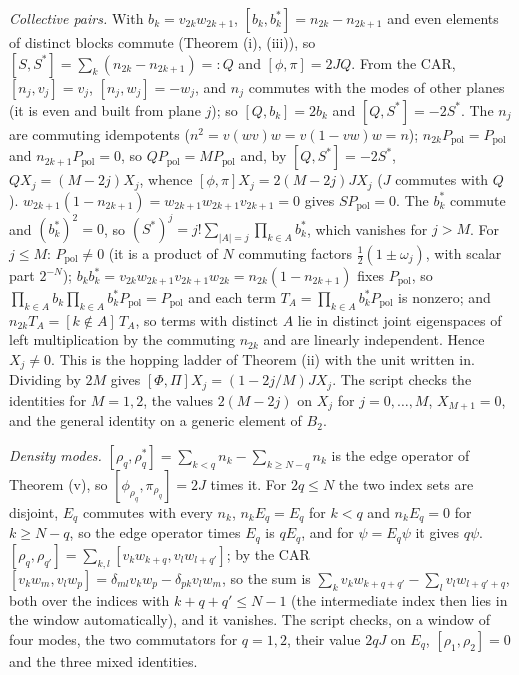\emph{Collective pairs.} With $b_{k} = v_{2k}w_{2k+1}$, $[b_{k}, b_{k}^{*}] = n_{2k} - n_{2k+1}$ and even elements of distinct blocks commute (Theorem (i), (iii)), so $[S, S^{*}] = \sum_{k}(n_{2k} - n_{2k+1}) =: Q$ and $[\phi, \pi] = 2JQ$. From the CAR, $[n_{j}, v_{j}] = v_{j}$, $[n_{j}, w_{j}] = -w_{j}$, and $n_{j}$ commutes with the modes of other planes (it is even and built from plane $j$); so $[Q, b_{k}] = 2b_{k}$ and $[Q, S^{*}] = -2S^{*}$. The $n_{j}$ are commuting idempotents ($n^{2} = v(wv)w = v(1 - vw)w = n$); $n_{2k}P_{\mathrm{pol}} = P_{\mathrm{pol}}$ and $n_{2k+1}P_{\mathrm{pol}} = 0$, so $QP_{\mathrm{pol}} = MP_{\mathrm{pol}}$ and, by $[Q, S^{*}] = -2S^{*}$, $QX_{j} = (M - 2j)X_{j}$, whence $[\phi, \pi]X_{j} = 2(M - 2j)JX_{j}$ ($J$ commutes with $Q$). $w_{2k+1}(1 - n_{2k+1}) = w_{2k+1}w_{2k+1}v_{2k+1} = 0$ gives $SP_{\mathrm{pol}} = 0$. The $b_{k}^{*}$ commute and $(b_{k}^{*})^{2} = 0$, so $(S^{*})^{j} = j!\sum_{|A| = j}\prod_{k \in A}b_{k}^{*}$, which vanishes for $j > M$. For $j \le M$: $P_{\mathrm{pol}} \neq 0$ (it is a product of $N$ commuting factors $\tfrac12(1 \pm \omega_{j})$, with scalar part $2^{-N}$); $b_{k}b_{k}^{*} = v_{2k}w_{2k+1}v_{2k+1}w_{2k} = n_{2k}(1 - n_{2k+1})$ fixes $P_{\mathrm{pol}}$, so $\prod_{k \in A}b_{k}\prod_{k \in A}b_{k}^{*}P_{\mathrm{pol}} = P_{\mathrm{pol}}$ and each term $T_{A} = \prod_{k \in A}b_{k}^{*}P_{\mathrm{pol}}$ is nonzero; and $n_{2k}T_{A} = [k \notin A]\,T_{A}$, so terms with distinct $A$ lie in distinct joint eigenspaces of left multiplication by the commuting $n_{2k}$ and are linearly independent. Hence $X_{j} \neq 0$. This is the hopping ladder of Theorem (ii) with the unit written in. Dividing by $2M$ gives $[\Phi, \Pi]X_{j} = (1 - 2j/M)JX_{j}$. The script checks the identities for $M = 1, 2$, the values $2(M - 2j)$ on $X_{j}$ for $j = 0, \dots, M$, $X_{M+1} = 0$, and the general identity on a generic element of $B_{2}$.

\emph{Density modes.} $[\rho_{q}, \rho_{q}^{*}] = \sum_{k<q}n_{k} - \sum_{k \ge N-q}n_{k}$ is the edge operator of Theorem (v), so $[\phi_{\rho_{q}}, \pi_{\rho_{q}}] = 2J$ times it. For $2q \le N$ the two index sets are disjoint, $E_{q}$ commutes with every $n_{k}$, $n_{k}E_{q} = E_{q}$ for $k < q$ and $n_{k}E_{q} = 0$ for $k \ge N - q$, so the edge operator times $E_{q}$ is $qE_{q}$, and for $\psi = E_{q}\psi$ it gives $q\psi$. $[\rho_{q}, \rho_{q'}] = \sum_{k, l}[v_{k}w_{k+q}, v_{l}w_{l+q'}]$; by the CAR $[v_{k}w_{m}, v_{l}w_{p}] = \delta_{ml}v_{k}w_{p} - \delta_{pk}v_{l}w_{m}$, so the sum is $\sum_{k}v_{k}w_{k+q+q'} - \sum_{l}v_{l}w_{l+q'+q}$, both over the indices with $k + q + q' \le N - 1$ (the intermediate index then lies in the window automatically), and it vanishes. The script checks, on a window of four modes, the two commutators for $q = 1, 2$, their value $2qJ$ on $E_{q}$, $[\rho_{1}, \rho_{2}] = 0$ and the three mixed identities.

